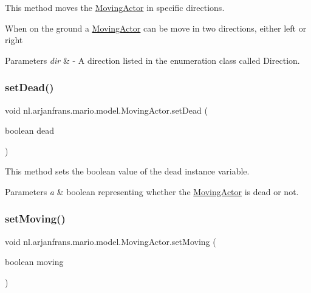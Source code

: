 This method moves the \hyperlink{classnl_1_1arjanfrans_1_1mario_1_1model_1_1MovingActor}{Moving\+Actor} in specific directions. 

When on the ground a \hyperlink{classnl_1_1arjanfrans_1_1mario_1_1model_1_1MovingActor}{Moving\+Actor} can be move in two directions, either left or right 
\begin{DoxyParams}{Parameters}
{\em dir} & -\/ A direction listed in the enumeration class called Direction. \\
\hline
\end{DoxyParams}
\mbox{\label{classnl_1_1arjanfrans_1_1mario_1_1model_1_1MovingActor_a331dd9271c5023d07f1840b029e703d9}} 
\subsubsection{\texorpdfstring{set\+Dead()}{setDead()}}
{\footnotesize\ttfamily void nl.\+arjanfrans.\+mario.\+model.\+Moving\+Actor.\+set\+Dead (\begin{DoxyParamCaption}\item[{boolean}]{dead }\end{DoxyParamCaption})}



This method sets the boolean value of the dead instance variable. 


\begin{DoxyParams}{Parameters}
{\em a} & boolean representing whether the \hyperlink{classnl_1_1arjanfrans_1_1mario_1_1model_1_1MovingActor}{Moving\+Actor} is dead or not. \\
\hline
\end{DoxyParams}
\mbox{\label{classnl_1_1arjanfrans_1_1mario_1_1model_1_1MovingActor_af9e155f3ced19b73b253ce8f2d8f044d}} 
\subsubsection{\texorpdfstring{set\+Moving()}{setMoving()}}
{\footnotesize\ttfamily void nl.\+arjanfrans.\+mario.\+model.\+Moving\+Actor.\+set\+Moving (\begin{DoxyParamCaption}\item[{boolean}]{moving }\end{DoxyParamCaption})}



